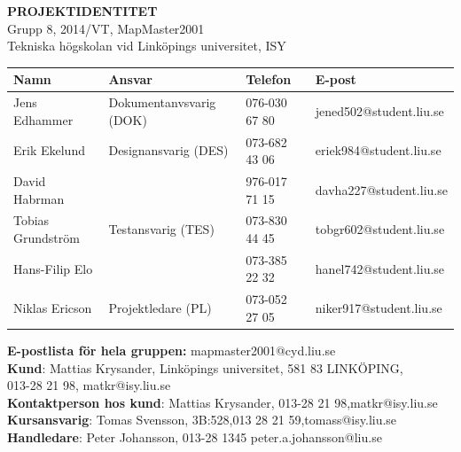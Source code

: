 \documentclass[a4paper,12pt,fleqn]{article}
\begin{document}
	\vspace*{\fill}
		\begingroup
			\begin{center}
				\LARGE{\textbf{PROJEKTIDENTITET}}
				\\
				\footnotesize
				Grupp 8, 2014/VT, MapMaster2001
				\\
				Tekniska högskolan vid Linköpings universitet, ISY
				\\
				\vspace{1cm}
	  \begin{tabular}{| p{3cm} | p{4.3cm} | p{2.4cm} | p{3.8cm} |}
	    \hline
		\textbf{Namn} & \textbf{Ansvar} & \textbf{Telefon} & \textbf{E-post} \\ \hline
	    Jens Edhammer & Dokumentanvsvarig (DOK) & 076-030 67 80 & jened502@student.liu.se \\ \hline
		Erik Ekelund & Designansvarig (DES) & 073-682 43 06 & eriek984@student.liu.se \\ \hline
		David Habrman &  & 976-017 71 15 & davha227@student.liu.se \\ \hline 
		Tobias Grundström & Testansvarig (TES) & 073-830 44 45 & tobgr602@student.liu.se \\ \hline 
		Hans-Filip Elo &   & 073-385 22 32 & hanel742@student.liu.se \\ \hline 
		Niklas Ericson & Projektledare (PL) & 073-052 27 05 & niker917@student.liu.se \\ \hline
	    \end{tabular}
		
		\vspace{1cm}
		\textbf{E-postlista för hela gruppen:} mapmaster2001@cyd.liu.se
		\\[0.5cm]
		
		\textbf{Kund}: Mattias Krysander, Linköpings universitet, 581 83  LINKÖPING, \\
		013-28 21 98, matkr@isy.liu.se \\
		\textbf{Kontaktperson hos kund}: Mattias Krysander, 013-28 21 98,matkr@isy.liu.se 
		\\
		\textbf{Kursansvarig}: Tomas Svensson, 3B:528,013 28 21 59,tomass@isy.liu.se
		\\[0.5cm]
		\textbf{Handledare}: Peter Johansson, 013-28 1345 peter.a.johansson@liu.se

				\end{center}
		\endgroup
	\vspace*{\fill}
\newpage

\end{document}
